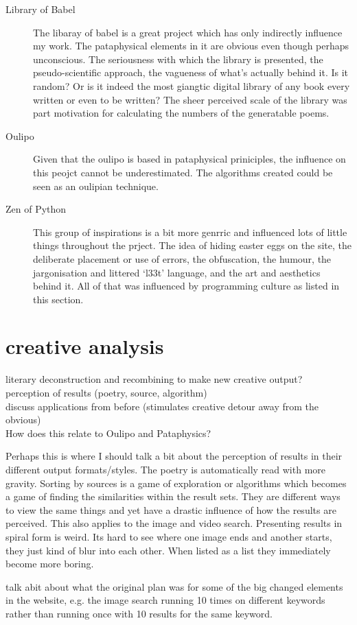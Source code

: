 \begin{description}
  \item[Library of Babel] The libaray of babel is a great project which has only indirectly influence my work. The pataphysical elements in it are obvious even though perhaps unconscious. The seriousness with which the library is presented, the pseudo-scientific approach, the vagueness of what's actually behind it. Is it random? Or is it indeed the most giangtic digital library of any book every written or even to be written? The sheer perceived scale of the library was part motivation for calculating the numbers of the generatable poems.
  \item[Oulipo] Given that the \gls{oulipo} is based in pataphysical priniciples, the influence on this peojct cannot be underestimated. The algorithms created could be seen as an oulipian technique.
  \item[Zen of Python] This group of inspirations is a bit more genrric and influenced lots of little things throughout the prject. The idea of hiding easter eggs on the site, the deliberate placement or use of errors, the obfuscation, the humour, the jargonisation and littered `l33t' language, and the art and aesthetics behind it. All of that was influenced by programming culture as listed in this section.
\end{description}


\section*{creative analysis}
\begin{draft}
  literary deconstruction and recombining to make new creative output? \\
  perception of results (poetry, source, algorithm) \\
  discuss applications from before (stimulates creative detour away from the obvious) \\

  How does this relate to Oulipo and Pataphysics? 

  Perhaps this is where I should talk a bit about the perception of results in their different output formats/styles. The poetry is automatically read with more gravity. Sorting by sources is a game of exploration or algorithms which becomes a game of finding the similarities within the result sets. They are different ways to view the same things and yet have a drastic influence of how the results are perceived. This also applies to the image and video search. Presenting results in spiral form is weird. Its hard to see where one image ends and another starts, they just kind of blur into each other. When listed as a list they immediately become more boring.

  talk abit about what the original plan was for some of the big changed elements in the website, e.g. the image search running 10 times on different keywords rather than running once with 10 results for the same keyword.
\end{draft}


